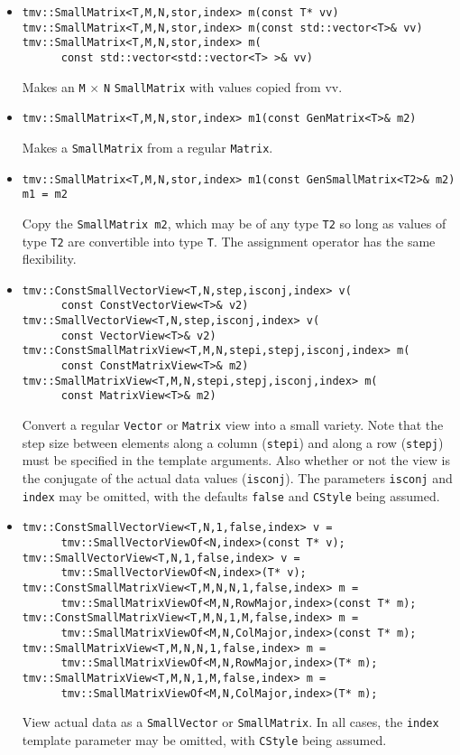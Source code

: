 \documentclass[twoside,letterpaper,11pt]{article}
\renewcommand{\tt}[1]{{\texttt {#1}}}
\begin{document}
\begin{itemize}
\item
\begin{verbatim}
tmv::SmallMatrix<T,M,N,stor,index> m(const T* vv)
tmv::SmallMatrix<T,M,N,stor,index> m(const std::vector<T>& vv)
tmv::SmallMatrix<T,M,N,stor,index> m(
      const std::vector<std::vector<T> >& vv)
\end{verbatim}
Makes an \tt{M} $\times$ \tt{N} \tt{SmallMatrix} with values copied from vv.

\item 
\begin{verbatim}
tmv::SmallMatrix<T,M,N,stor,index> m1(const GenMatrix<T>& m2)
\end{verbatim}
Makes a \tt{SmallMatrix} from a regular \tt{Matrix}.

\item
\begin{verbatim}
tmv::SmallMatrix<T,M,N,stor,index> m1(const GenSmallMatrix<T2>& m2)
m1 = m2
\end{verbatim}
Copy the \tt{SmallMatrix m2}, which may be of any type \tt{T2} so long
as values of type \tt{T2} are convertible into type \tt{T}.
The assignment operator has the same flexibility.

\item
\begin{verbatim}
tmv::ConstSmallVectorView<T,N,step,isconj,index> v(
      const ConstVectorView<T>& v2)
tmv::SmallVectorView<T,N,step,isconj,index> v(
      const VectorView<T>& v2)
tmv::ConstSmallMatrixView<T,M,N,stepi,stepj,isconj,index> m(
      const ConstMatrixView<T>& m2)
tmv::SmallMatrixView<T,M,N,stepi,stepj,isconj,index> m(
      const MatrixView<T>& m2)
\end{verbatim}
Convert a regular \tt{Vector} or \tt{Matrix} view into a
small variety.  Note that the step size between elements along a
column (\tt{stepi}) and along a row (\tt{stepj}) must be
specified in the template arguments.  Also whether or not the
view is the conjugate of the actual data values (\tt{isconj}).
The parameters \tt{isconj} and \tt{index} may be omitted,
with the defaults \tt{false} and \tt{CStyle} being assumed.

\item
\begin{verbatim}
tmv::ConstSmallVectorView<T,N,1,false,index> v =
      tmv::SmallVectorViewOf<N,index>(const T* v);
tmv::SmallVectorView<T,N,1,false,index> v =
      tmv::SmallVectorViewOf<N,index>(T* v);
tmv::ConstSmallMatrixView<T,M,N,N,1,false,index> m =
      tmv::SmallMatrixViewOf<M,N,RowMajor,index>(const T* m);
tmv::ConstSmallMatrixView<T,M,N,1,M,false,index> m =
      tmv::SmallMatrixViewOf<M,N,ColMajor,index>(const T* m);
tmv::SmallMatrixView<T,M,N,N,1,false,index> m =
      tmv::SmallMatrixViewOf<M,N,RowMajor,index>(T* m);
tmv::SmallMatrixView<T,M,N,1,M,false,index> m =
      tmv::SmallMatrixViewOf<M,N,ColMajor,index>(T* m);
\end{verbatim}
View actual data as a \tt{SmallVector} or \tt{SmallMatrix}.
In all cases, the \tt{index} template parameter may be omitted, with
\tt{CStyle} being assumed.

\end{itemize}
\end{document}
